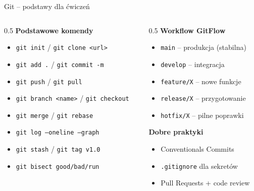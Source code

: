 \documentclass{beamer}
\begin{document}
\begin{frame}[fragile]{Git -- podstawy dla \'{c}wicze\'n}
    \begin{columns}[T]
        \begin{column}{0.5\textwidth}
            \textbf{Podstawowe komendy}
            \begin{itemize}
                \item \texttt{git init} / \texttt{git clone <url>}
                \item \texttt{git add .} / \texttt{git commit -m}
                \item \texttt{git push} / \texttt{git pull}
                \item \texttt{git branch <name>} / \texttt{git checkout}
                \item \texttt{git merge} / \texttt{git rebase}
                \item \texttt{git log --oneline --graph}
                \item \texttt{git stash} / \texttt{git tag v1.0}
                \item \texttt{git bisect good/bad/run}
            \end{itemize}
        \end{column}
        \begin{column}{0.5\textwidth}
            \textbf{Workflow GitFlow}
            \begin{itemize}
                \item \texttt{main} -- produkcja (stabilna)
                \item \texttt{develop} -- integracja
                \item \texttt{feature/X} -- nowe funkcje
                \item \texttt{release/X} -- przygotowanie
                \item \texttt{hotfix/X} -- pilne poprawki
            \end{itemize}
            \vspace{0.3em}
            \textbf{Dobre praktyki}
            \begin{itemize}
                \item Conventionals Commits
                \item \texttt{.gitignore} dla sekret\'ow
                \item Pull Requests + code review
            \end{itemize}
        \end{column}
    \end{columns}
\end{frame}
\end{document}
